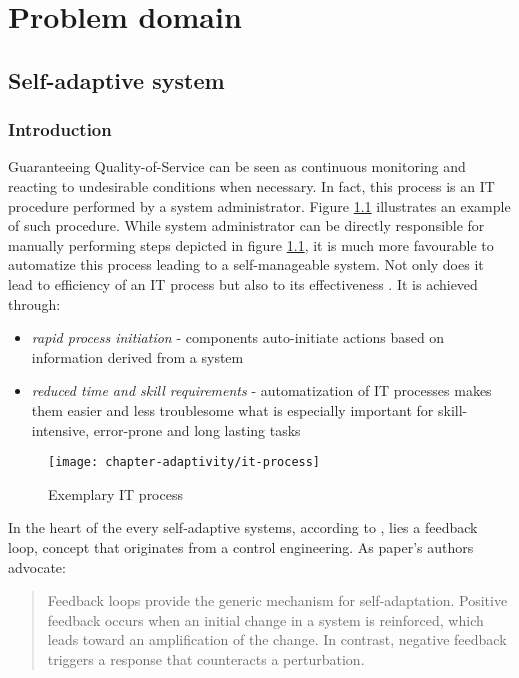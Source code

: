 \chapter{Problem domain}

\section{Self-adaptive system}

\subsection{Introduction}
Guaranteeing Quality-of-Service can be seen as continuous monitoring and reacting to undesirable conditions when necessary. In fact, this process is an IT procedure performed by a system administrator. Figure \ref{fig:it-process} illustrates an example of such procedure. While system administrator can be directly responsible for manually performing steps depicted in figure \ref{fig:it-process}, it is much more favourable to automatize this process leading to a self-manageable system. Not only does it lead to efficiency of an IT process but also to its effectiveness \cite{IBM06}. It is achieved through:
\begin{itemize}
  \item \emph{rapid process initiation} - components auto-initiate actions based on information derived from a system
  \item \emph{reduced time and skill requirements} - automatization of IT processes makes them easier and less troublesome what is especially important for skill-intensive, error-prone and long lasting tasks
\end{itemize}

\begin{figure}[!ht]
  \begin{center}
    \texttt{[image: chapter-adaptivity/it-process]}
  \end{center}
  \caption{Exemplary IT process}
  \label{fig:it-process}
\end{figure}


In the heart of the every self-adaptive systems, according to \cite{brun2009engineering}, lies a feedback loop, concept that originates from a control engineering. As paper's authors advocate:
\begin{quote}
Feedback loops provide the generic mechanism for self-adaptation. Positive feedback occurs when an initial change in a system is reinforced, which leads toward an amplification of the change. In contrast, negative feedback triggers a response that counteracts a perturbation. 
\end{quote}

